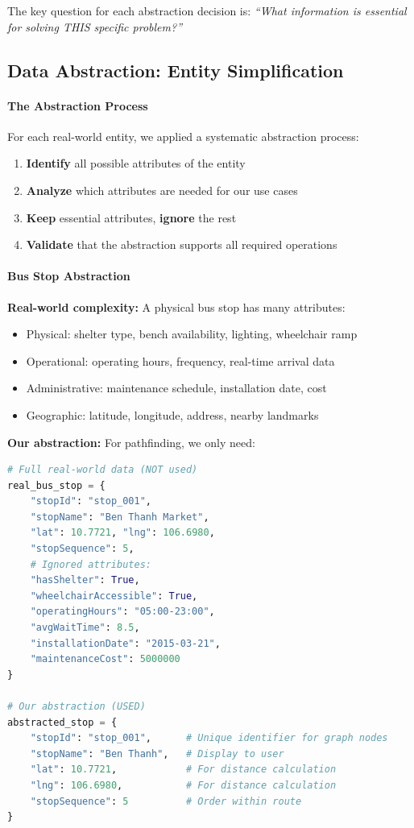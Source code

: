 The key question for each abstraction decision is: \textit{``What information is essential for solving THIS specific problem?''}

\subsection{Data Abstraction: Entity Simplification}

\paragraph{The Abstraction Process}
For each real-world entity, we applied a systematic abstraction process:

\begin{enumerate}[noitemsep]
    \item \textbf{Identify} all possible attributes of the entity
    \item \textbf{Analyze} which attributes are needed for our use cases
    \item \textbf{Keep} essential attributes, \textbf{ignore} the rest
    \item \textbf{Validate} that the abstraction supports all required operations
\end{enumerate}

\paragraph{Bus Stop Abstraction}

\textbf{Real-world complexity:} A physical bus stop has many attributes:
\begin{itemize}[noitemsep]
    \item Physical: shelter type, bench availability, lighting, wheelchair ramp
    \item Operational: operating hours, frequency, real-time arrival data
    \item Administrative: maintenance schedule, installation date, cost
    \item Geographic: latitude, longitude, address, nearby landmarks
\end{itemize}

\textbf{Our abstraction:} For pathfinding, we only need:
\begin{lstlisting}[language=Python, caption={Bus Stop Data Abstraction}]
# Full real-world data (NOT used)
real_bus_stop = {
    "stopId": "stop_001",
    "stopName": "Ben Thanh Market",
    "lat": 10.7721, "lng": 106.6980,
    "stopSequence": 5,
    # Ignored attributes:
    "hasShelter": True,
    "wheelchairAccessible": True,
    "operatingHours": "05:00-23:00",
    "avgWaitTime": 8.5,
    "installationDate": "2015-03-21",
    "maintenanceCost": 5000000
}

# Our abstraction (USED)
abstracted_stop = {
    "stopId": "stop_001",      # Unique identifier for graph nodes
    "stopName": "Ben Thanh",   # Display to user
    "lat": 10.7721,            # For distance calculation
    "lng": 106.6980,           # For distance calculation
    "stopSequence": 5          # Order within route
}
\end{lstlisting}

